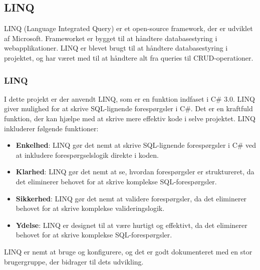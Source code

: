 \subsection{LINQ}
LINQ (Language Integrated Query) er et open-source framework, der er udviklet af Microsoft. Frameworket er bygget til at håndtere databasestyring i webapplikationer.
LINQ er blevet brugt til at håndtere databasestyring i projektet, og har været med til at håndtere alt fra queries til CRUD-operationer.

\subsubsection{LINQ}
I dette projekt er der anvendt LINQ, som er en funktion indfaset i C\# 3.0. LINQ giver mulighed for at skrive SQL-lignende forespørgsler i C\#. Det er en kraftfuld funktion, der kan hjælpe med at skrive mere effektiv kode i selve projektet.
LINQ inkluderer følgende funktioner:
\begin{itemize}
    \item \textbf{Enkelhed}: LINQ gør det nemt at skrive SQL-lignende forespørgsler i C\# ved at inkludere forespørgselslogik direkte i koden.
    \item \textbf{Klarhed}: LINQ gør det nemt at se, hvordan forespørgsler er struktureret, da det eliminerer behovet for at skrive komplekse SQL-forespørgsler.
    \item \textbf{Sikkerhed}: LINQ gør det nemt at validere forespørgsler, da det eliminerer behovet for at skrive komplekse valideringslogik.
    \item \textbf{Ydelse}: LINQ er designet til at være hurtigt og effektivt, da det eliminerer behovet for at skrive komplekse SQL-forespørgsler.
\end{itemize}
LINQ er nemt at bruge og konfigurere, og det er godt dokumenteret med en stor brugergruppe, der bidrager til dets udvikling.


